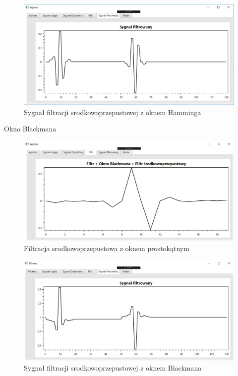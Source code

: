 \documentclass[12pt]{article}
\begin{document}
\newpage
\begin{figure}[h!]
 \centering
 \includegraphics[width=12.3cm]{prostSFSHn.PNG}
 \vspace{-0.3cm}
 \caption{Sygnał filtracji srodkowoprzepustowej z oknem Hamminga}
 \label{sfshn}
\end{figure}

Okno Blackmana
\begin{figure}[h!]
 \centering
 \includegraphics[width=12.3cm]{prostFSOB.PNG}
 \vspace{-0.3cm}
 \caption{Filtracja srodkowoprzepustowa z oknem prostokątnym}
 \label{fsob}
\end{figure}

\newpage

\begin{figure}[h!]
 \centering
 \includegraphics[width=12.3cm]{prostSFSB.PNG}
 \vspace{-0.3cm}
 \caption{Sygnał filtracji srodkowoprzepustowej z oknem Blackmana}
 \label{ob}
\end{figure}
\end{document}
